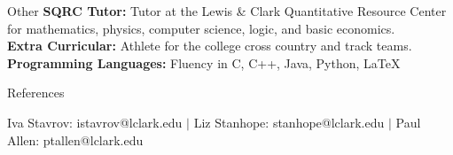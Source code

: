 \documentclass{resume}
\begin{document}
\vspace{-1mm}
\begin{rSection}{Other}
    \textbf{SQRC Tutor:} Tutor at the Lewis \& Clark Quantitative Resource Center for
    mathematics, physics, computer science, logic, and basic economics.\\
    \textbf{Extra Curricular:} Athlete for the college cross country and
    track teams.\\
    \textbf{Programming Languages:} Fluency in C, C++, Java, Python,
    \LaTeX
\end{rSection}
\vspace{-1mm}
\begin{rSection}{References}

    Iva Stavrov: istavrov@lclark.edu $\vert$ Liz Stanhope:
    stanhope@lclark.edu $\vert$ Paul Allen: ptallen@lclark.edu\\

\end{rSection}
\end{document}
